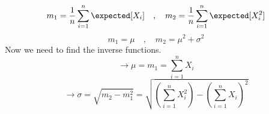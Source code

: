 $$
m_1 = \frac{1}{n}\sum_{i = 1}^n\expected[X_i] \quad,\quad m_2 = \frac{1}{n}\sum_{i = 1}^n\expected[X_i^2]
$$
$$
m_1 = \mu\quad,\quad m_2 = \mu^2 + \sigma^2
$$
Now we need to find the inverse functions.
$$
\rightarrow \mu = m_1 = \sum_{i=1}^nX_i
$$
$$
\rightarrow \sigma = \sqrt{m_2 - m_1^2} = \sqrt{(\sum_{i = 1}^nX^2_i) - (\sum_{i = 1}^nX_i)^2}
$$

